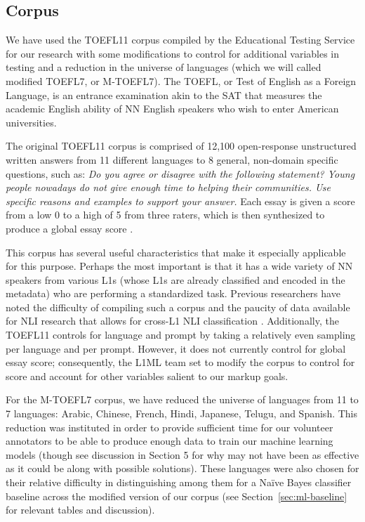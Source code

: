\documentclass[10pt, a4paper]{article}
\begin{document}
\subsection{Corpus\label{sec:corpus}}
We have used the TOEFL11 corpus compiled by the Educational Testing Service for our research with some modifications to control for additional variables in testing and a reduction in the universe of languages (which we will called modified TOEFL7, or M-TOEFL7). The TOEFL, or Test of English as a Foreign Language, is an entrance examination akin to the SAT that measures the academic English ability of NN English speakers who wish to enter American universities. 

The original TOEFL11 corpus is comprised of 12,100 open-response unstructured written answers from 11 different languages to 8 general, non-domain specific questions, such as: \textit{Do you agree or disagree with the following statement? Young people nowadays do not give enough time to helping their communities. Use specific reasons and examples to support your answer.} Each essay is given a score from a low 0 to a high of 5 from three raters, which is then synthesized to produce a global essay score \cite{toefl11-report}. 

This corpus has several useful characteristics that make it especially applicable for this purpose. Perhaps the most important is that it has a wide variety of NN speakers from various L1s (whose L1s are already classified and encoded in the metadata) who are performing a standardized task. Previous researchers have noted the difficulty of compiling such a corpus and the paucity of data available for NLI research that allows for cross-L1 NLI classification \cite{toefl11-report}. Additionally, the TOEFL11 controls for language and prompt by taking a relatively even sampling per language and per prompt. However, it does not currently control for global essay score; consequently, the L1ML team set to modify the corpus to control for score and account for other variables salient to our markup goals. 

For the M-TOEFL7 corpus, we have reduced the universe of languages from 11 to 7 languages: Arabic, Chinese, French, Hindi, Japanese, Telugu, and Spanish. This reduction was instituted in order to provide sufficient time for our volunteer annotators to be able to produce enough data to train our machine learning models (though see discussion in Section 5 for why may not have been as effective as it could be along with possible solutions). These languages were also chosen for their relative difficulty in distinguishing among them for a Naïve Bayes classifier baseline across the modified version of our corpus (see Section~\ref{sec:ml-baseline} for relevant tables and discussion).
\end{document}
